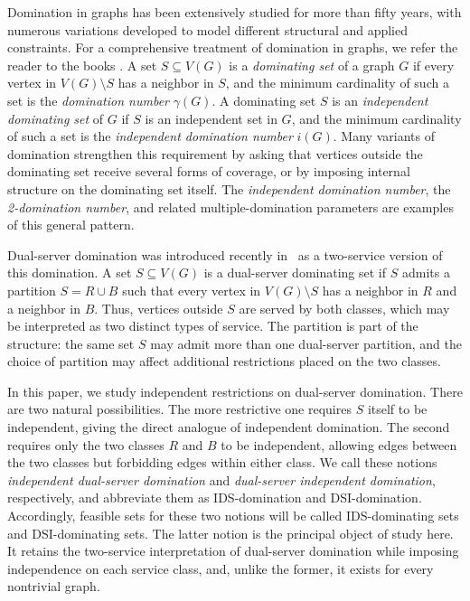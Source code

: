 \documentclass[11pt]{article}
\theoremstyle{definition}
\theoremstyle{remark}
\begin{document}
Domination in graphs has been extensively studied for more than fifty years,
with numerous variations developed to model different structural and applied
constraints. For a comprehensive treatment of domination in graphs, we refer
the reader to the books \cite{hhh1,hhh2,hhh3}. A set \(S\subseteq V(G)\) is a
\emph{dominating set} of a graph \(G\) if every vertex in \(V(G)\setminus S\) has a
neighbor in \(S\), and the minimum cardinality of such a set is the
\emph{domination number} \(\gamma(G)\).  A dominating set $S$ is an \emph{independent dominating set} of $G$ if $S$ is an independent set in $G$, and the minimum cardinality of such a set is the
\emph{independent domination number} \(i(G)\). Many variants of domination strengthen
this requirement by asking that vertices outside the dominating set receive
several forms of coverage, or by imposing internal structure on the dominating
set itself. The \emph{independent domination number}, the
\emph{2-domination number}, and related multiple-domination parameters are examples of
this general pattern.

Dual-server domination was introduced recently in~\cite{chh} as a two-service version of this
domination. A set \(S\subseteq V(G)\) is a dual-server dominating set if \(S\)
admits a partition \(S=R\cup B\) such that every vertex in \(V(G)\setminus S\)
has a neighbor in \(R\) and a neighbor in \(B\). Thus, vertices outside \(S\)
are served by both classes, which may be interpreted as two distinct types of
service. The partition is part of the structure: the same set \(S\) may admit
more than one dual-server partition, and the choice of partition may affect
additional restrictions placed on the two classes.

In this paper, we study independent restrictions on dual-server domination. There
are two natural possibilities. The more restrictive one requires \(S\) itself
to be independent, giving the direct analogue of independent domination. The
second requires only the two classes \(R\) and \(B\) to be independent,
allowing edges between the two classes but forbidding edges within either
class. We call these notions \emph{independent dual-server domination} and
\emph{dual-server independent domination}, respectively, and abbreviate them
as IDS-domination and DSI-domination. Accordingly, feasible sets for these two
notions will be called IDS-dominating sets and DSI-dominating sets. The
latter notion is the principal object of study here. It retains the
two-service interpretation of dual-server domination while imposing independence on each service class, and, unlike the
former, it exists for every nontrivial graph.
\end{document}

